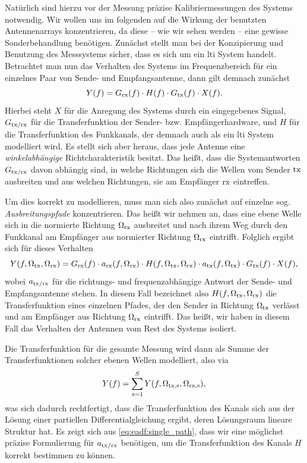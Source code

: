 Natürlich sind hierzu vor der Messung präzise Kalibriermessungen des Systems notwendig.
Wir wollen uns im folgenden auf die Wirkung der benutzten Antennenarrays konzentrieren, da diese -- wie wir sehen werden -- eine gewisse Sonderbehandlung benötigen.
Zunächst stellt man bei der Konzipierung und Benutzung des Messsystems sicher, dass es sich um ein \gls{lti} System handelt.
Betrachtet man nun das Verhalten des Systems im Frequenzbereich für ein einzelnes Paar von Sende- und Empfangsantenne, dann gilt demnach zunächst
\begin{equation}
    Y(f) = G_{\rm rx}(f) \cdot H(f) \cdot G_{\rm tx}(f) \cdot X(f).
\end{equation}
Hierbei steht $X$ für die Anregung des Systems durch ein eingegebenes Signal, $G_{\rm tx/\rm rx}$ für die Transferfunktion der Sender- bzw. Empfängerhardware, und $H$ für die Transferfunktion des Funkkanals, der demnach auch als ein \gls{lti} System modelliert wird.
Es stellt sich aber heraus, dass jede Antenne eine \emph{winkelabhängige} Richtcharakteristik besitzt.
Das heißt, dass die Systemantworten $G_{\rm tx/\rm rx}$ davon abhängig sind, in welche Richtungen sich die Wellen vom Sender $\rm tx$ ausbreiten und aus welchen Richtungen, sie am Empfänger $\rm rx$ eintreffen. 

Um dies korrekt zu modellieren, muss man sich also zunächst auf einzelne sog. \emph{Ausbreitungspfade} konzentrieren.
Das heißt wir nehmen an, dass eine ebene Welle sich in die normierte Richtung $\Omega_{\rm tx}$ ausbreitet und nach ihrem Weg durch den Funkkanal am Empfänger aus normierter Richtung $\Omega_{\rm rx}$ eintrifft. 
Folglich ergibt sich für dieses Verhalten
\begin{equation}\label{eq:eadf:single_path}
    Y(f, \Omega_{\rm tx}, \Omega_{\rm rx}) = 
        G_{\rm rx}(f) \cdot a_{\rm rx}(f, \Omega_{\rm rx})
        \cdot H(f, \Omega_{\rm tx}, \Omega_{\rm rx}) 
        \cdot a_{\rm tx}(f, \Omega_{\rm tx}) \cdot G_{\rm tx}(f)
        \cdot X(f),
\end{equation}
%
wobei $a_{\rm tx/\rm rx}$ für die richtungs- und frequenzabhängige Antwort der Sende- und Empfangsantenne stehen.
In diesem Fall bezeichnet also $H(f, \Omega_{\rm tx}, \Omega_{\rm rx})$ die Transferfunktion eines einzelnen Pfades, der den Sender in Richtung $\Omega_{\rm tx}$ verlässt und am Empfänger aus Richtung $\Omega_{\rm rx}$ eintrifft.
Das heißt, wir haben in diesem Fall das Verhalten der Antennen vom Rest des Systems isoliert. 

Die Transferfunktion für die gesamte Messung wird dann als Summe der Transferfunktionen solcher ebenen Wellen modelliert, also via
\begin{equation}
    Y(f) = {\sum\limits_{s = 1}^{S}{
        Y(f, \Omega_{\rm tx,s}, \Omega_{\rm rx,s})
    }},
\end{equation}
was sich dadurch rechtfertigt, dass die Transferfunktion des Kanals sich aus der Lösung einer partiellen Differentialgleichung ergibt, deren Lösungsraum lineare Struktur hat.
Es zeigt sich aus \eqref{eq:eadf:single_path}, dass wir eine möglichst präzise Formulierung für $a_{\rm tx/\rm rx}$ benötigen, um die Transferfunktion des Kanals $H$ korrekt bestimmen zu können.
%
%
%
